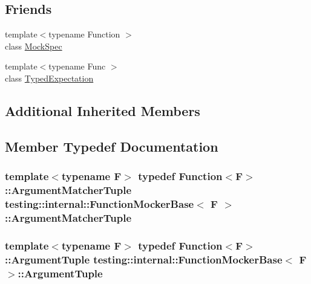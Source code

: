 \subsection*{Friends}
\begin{DoxyCompactItemize}
\item 
{\footnotesize template$<$typename Function $>$ }\\class \hyperlink{classtesting_1_1internal_1_1FunctionMockerBase_ae72aeee91c93e8ae5e1ed7f726a766b2}{Mock\+Spec}
\item 
{\footnotesize template$<$typename Func $>$ }\\class \hyperlink{classtesting_1_1internal_1_1FunctionMockerBase_a4f17de55396a8ef740d5ad2b1380a851}{Typed\+Expectation}
\end{DoxyCompactItemize}
\subsection*{Additional Inherited Members}


\subsection{Member Typedef Documentation}
\subsubsection[{\texorpdfstring{Argument\+Matcher\+Tuple}{ArgumentMatcherTuple}}]{\setlength{\rightskip}{0pt plus 5cm}template$<$typename F$>$ typedef {\bf Function}$<$F$>$\+::{\bf Argument\+Matcher\+Tuple} {\bf testing\+::internal\+::\+Function\+Mocker\+Base}$<$ F $>$\+::{\bf Argument\+Matcher\+Tuple}}\hypertarget{classtesting_1_1internal_1_1FunctionMockerBase_ab790bcb1dcf57fa6659365386723ae5a}{}\label{classtesting_1_1internal_1_1FunctionMockerBase_ab790bcb1dcf57fa6659365386723ae5a}
\subsubsection[{\texorpdfstring{Argument\+Tuple}{ArgumentTuple}}]{\setlength{\rightskip}{0pt plus 5cm}template$<$typename F$>$ typedef {\bf Function}$<$F$>$\+::{\bf Argument\+Tuple} {\bf testing\+::internal\+::\+Function\+Mocker\+Base}$<$ F $>$\+::{\bf Argument\+Tuple}}\hypertarget{classtesting_1_1internal_1_1FunctionMockerBase_a336432a07e544af4ffb8103603471ca3}{}\label{classtesting_1_1internal_1_1FunctionMockerBase_a336432a07e544af4ffb8103603471ca3}
